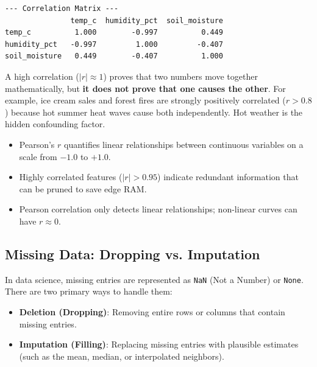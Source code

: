 \begin{lstlisting}[style=outputstyle]
--- Correlation Matrix ---
               temp_c  humidity_pct  soil_moisture
temp_c          1.000        -0.997          0.449
humidity_pct   -0.997         1.000         -0.407
soil_moisture   0.449        -0.407          1.000
\end{lstlisting}

\begin{warning}
A high correlation ($|r| \approx 1$) proves that two numbers move together mathematically, but \textbf{it does not prove that one causes the other}. For example, ice cream sales and forest fires are strongly positively correlated ($r > 0.8$) because hot summer heat waves cause both independently. Hot weather is the hidden confounding factor.
\end{warning}

\begin{takeaways}
\begin{itemize}
    \item Pearson's $r$ quantifies linear relationships between continuous variables on a scale from $-1.0$ to $+1.0$.
    \item Highly correlated features ($|r| > 0.95$) indicate redundant information that can be pruned to save edge RAM.
    \item Pearson correlation only detects linear relationships; non-linear curves can have $r \approx 0$.
\end{itemize}
\end{takeaways}

\subsection{Missing Data: Dropping vs. Imputation}

\begin{keyidea}
In data science, missing entries are represented as \texttt{NaN} (Not a Number) or \texttt{None}. 
There are two primary ways to handle them:
\begin{itemize}
    \item \textbf{Deletion (Dropping)}: Removing entire rows or columns that contain missing entries.
    \item \textbf{Imputation (Filling)}: Replacing missing entries with plausible estimates (such as the mean, median, or interpolated neighbors).
\end{itemize}
\end{keyidea}

